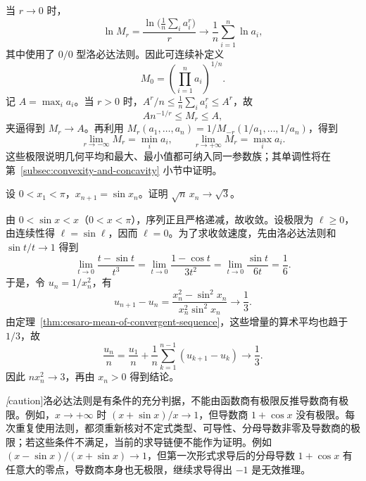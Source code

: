 \documentclass[UTF8,12pt,a4paper,fontset=fandol]{ctexbook}
\begin{document}
\begin{solve}
当 $r\to0$ 时，
\[
    \ln M_r=\frac{\ln\bigl(\frac1n\sum_i a_i^r\bigr)}r
    \longrightarrow\frac1n\sum_{i=1}^n\ln a_i,
\]
其中使用了 $0/0$ 型洛必达法则。因此可连续补定义
\begin{equation}
    M_0=\left(\prod_{i=1}^n a_i\right)^{1/n}.
    \label{eq:power-mean-zero-parameter}
\end{equation}
记 $A=\max_i a_i$。当 $r>0$ 时，$A^r/n\leq\frac1n\sum_i a_i^r\leq A^r$，故
\[
    A n^{-1/r}\leq M_r\leq A,
\]
夹逼得到 $M_r\to A$。再利用 $M_r(a_1,\ldots,a_n)=1/M_{-r}(1/a_1,\ldots,1/a_n)$，得到
\begin{equation}
    \lim_{r\to-\infty}M_r=\min_i a_i,
    \qquad \lim_{r\to+\infty}M_r=\max_i a_i.
    \label{eq:power-mean-infinite-parameter-limits}
\end{equation}
这些极限说明几何平均和最大、最小值都可纳入同一参数族；其单调性将在第~\ref{subsec:convexity-and-concavity} 小节中证明。
\end{solve}

\begin{example}
\label{ex:iterated-sine-asymptotic-rate}
设 $0<x_1<\pi$，$x_{n+1}=\sin x_n$。证明 $\sqrt{n}\,x_n\to\sqrt{3}$。
\end{example}

\begin{solve}
由 $0<\sin x<x$（$0<x<\pi$），序列正且严格递减，故收敛。设极限为 $\ell\geq0$，由连续性得 $\ell=\sin\ell$，因而 $\ell=0$。为了求收敛速度，先由洛必达法则和 $\sin t/t\to1$ 得到
\[
    \lim_{t\to0}\frac{t-\sin t}{t^3}
    =\lim_{t\to0}\frac{1-\cos t}{3t^2}
    =\lim_{t\to0}\frac{\sin t}{6t}=\frac16.
\]
于是，令 $u_n=1/x_n^2$，有
\[
    u_{n+1}-u_n
    =\frac{x_n^2-\sin^2x_n}{x_n^2\sin^2x_n}
    \longrightarrow\frac13.
\]
由定理~\ref{thm:cesaro-mean-of-convergent-sequence}，这些增量的算术平均也趋于 $1/3$，故
\[
    \frac{u_n}n=\frac{u_1}n+
    \frac1n\sum_{k=1}^{n-1}(u_{k+1}-u_k)\longrightarrow\frac13.
\]
因此 $nx_n^2\to3$，再由 $x_n>0$ 得到结论。
\end{solve}

\emph[caution]{洛必达法则是有条件的充分判据，不能由函数商有极限反推导数商有极限。}例如，$x\to+\infty$ 时 $(x+\sin x)/x\to1$，但导数商 $1+\cos x$ 没有极限。每次重复使用法则，都须重新核对不定式类型、可导性、分母导数非零及导数商的极限；若这些条件不满足，当前的求导链便不能作为证明。例如 $(x-\sin x)/(x+\sin x)\to1$，但第一次形式求导后的分母导数 $1+\cos x$ 有任意大的零点，导数商本身也无极限，继续求导得出 $-1$ 是无效推理。
\end{document}
